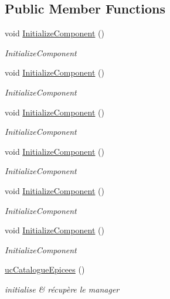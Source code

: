 \subsection*{Public Member Functions}
\begin{DoxyCompactItemize}
\item 
void \hyperlink{classnewPizza1_1_1ucCatalogueEpicees_a88c609f29d5b46d57c31019576f8d7d8}{Initialize\+Component} ()
\begin{DoxyCompactList}\small\item\em Initialize\+Component \end{DoxyCompactList}\item 
void \hyperlink{classnewPizza1_1_1ucCatalogueEpicees_a88c609f29d5b46d57c31019576f8d7d8}{Initialize\+Component} ()
\begin{DoxyCompactList}\small\item\em Initialize\+Component \end{DoxyCompactList}\item 
void \hyperlink{classnewPizza1_1_1ucCatalogueEpicees_a88c609f29d5b46d57c31019576f8d7d8}{Initialize\+Component} ()
\begin{DoxyCompactList}\small\item\em Initialize\+Component \end{DoxyCompactList}\item 
void \hyperlink{classnewPizza1_1_1ucCatalogueEpicees_a88c609f29d5b46d57c31019576f8d7d8}{Initialize\+Component} ()
\begin{DoxyCompactList}\small\item\em Initialize\+Component \end{DoxyCompactList}\item 
void \hyperlink{classnewPizza1_1_1ucCatalogueEpicees_a88c609f29d5b46d57c31019576f8d7d8}{Initialize\+Component} ()
\begin{DoxyCompactList}\small\item\em Initialize\+Component \end{DoxyCompactList}\item 
void \hyperlink{classnewPizza1_1_1ucCatalogueEpicees_a88c609f29d5b46d57c31019576f8d7d8}{Initialize\+Component} ()
\begin{DoxyCompactList}\small\item\em Initialize\+Component \end{DoxyCompactList}\item 
\hyperlink{classnewPizza1_1_1ucCatalogueEpicees_a365541ffe4ce35f69bd313284950d564}{uc\+Catalogue\+Epicees} ()
\begin{DoxyCompactList}\small\item\em initialise \& récupère le manager \end{DoxyCompactList}\end{DoxyCompactItemize}
